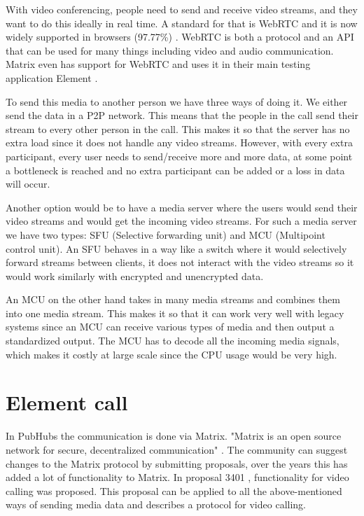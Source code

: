 \documentclass[11pt,a4paper]{article}
\begin{document}
With video conferencing, people need to send and receive video streams, and they want to do this ideally in real time. A standard for that is WebRTC and it is now widely supported in browsers (97.77\%) \cite{CIUIWEBRTC}. WebRTC is both a protocol and an API that can be used for many things including video and audio communication. Matrix even has support for WebRTC and uses it in their main testing application Element \cite{ELEMENT}. 

To send this media to another person we have three ways of doing it. We either send the data in a P2P network. This means that the people in the call send their stream to every other person in the call. This makes it so that the server has no extra load since it does not handle any video streams. However, with every extra participant, every user needs to send/receive more and more data, at some point a bottleneck is reached and no extra participant can be added or a loss in data will occur. 

Another option would be to have a media server where the users would send their video streams and would get the incoming video streams. For such a media server we have two types: SFU (Selective forwarding unit) and MCU (Multipoint control unit). An SFU behaves in a way like a switch where it would selectively forward streams between clients, it does not interact with the video streams so it would work similarly with encrypted and unencrypted data.  

An MCU on the other hand takes in many media streams and combines them into one media stream. This makes it so that it can work very well with legacy systems since an MCU can receive various types of media and then output a standardized output. The MCU has to decode all the incoming media signals, which makes it costly at large scale since the CPU usage would be very high.

\section{Element call}
In PubHubs the communication is done via Matrix. "Matrix is an open source network for secure, decentralized communication" \cite{MATRIX}. The community can suggest changes to the Matrix protocol by submitting proposals, over the years this has added a lot of functionality to Matrix. In proposal 3401 \cite{MATRIX_VIDEO_CALL_PROP}, functionality for video calling was proposed. This proposal can be applied to all the above-mentioned ways of sending media data and describes a protocol for video calling. 
\end{document}

